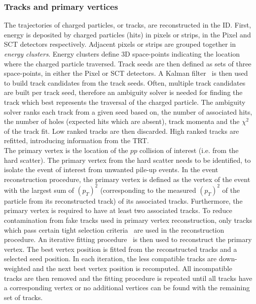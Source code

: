 \subsubsection{Tracks and primary vertices}

The trajectories of charged particles, or tracks, are reconstructed in the ID. First, energy is deposited by charged particles (hits) in pixels or strips, in the Pixel and SCT detectors respectively. Adjacent pixels or strips are grouped together in \textit{energy clusters}. Energy clusters define 3D space-points indicating the location where the charged particle traversed. Track seeds are then defined as sets of three space-points, in either the Pixel or SCT detectors. A Kalman filter~\cite{ASTIER2000138} is then used to build track candidates from the track seeds. Often, multiple track candidates are built per track seed, therefore an ambiguity solver is needed for finding the track which best represents the traversal of the charged particle. The ambiguity solver ranks each track from a given seed based on, the number of associated hits, the number of holes (expected hits which are absent), track momenta and the $\chi^{2}$ of the track fit. Low ranked tracks are then discarded. High ranked tracks are refitted, introducing information from the TRT.\\

The primary vertex is the location of the $pp$ collision of interest (i.e. from the hard scatter). The primary vertex from the hard scatter needs to be identified, to isolate the event of interest from unwanted pile-up events. In the event reconstruction procedure, the primary vertex is defined as the vertex of the event with the largest sum of $(p_{T})^{2}$ (corresponding to the measured $(p_{T})^{2}$ of the particle from its reconstructed track) of its associated tracks. Furthermore, the primary vertex is required to have at least two associated tracks. To reduce contamination from fake tracks used in primary vertex reconstruction, only tracks which pass certain tight selection criteria~\cite{Meloni_2016} are used in the reconstruction procedure. An iterative fitting procedure~\cite{Meloni_2016} is then used to reconstruct the primary vertex. The best vertex position is fitted from the reconstructed tracks and a selected seed position. In each iteration, the less compatible tracks are down-weighted and the next best vertex position is recomputed. All incompatible tracks are then removed and the fitting procedure is repeated until all tracks have a corresponding vertex or no additional vertices can be found with the remaining set of tracks.
